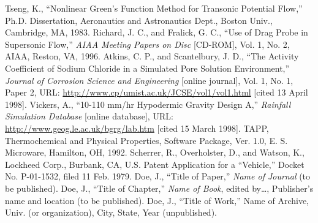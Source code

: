 \documentclass{AIAA}
\begin{document}
\begin{thebibliography}{}
 Tseng, K., ``Nonlinear Green's Function Method for Transonic Potential Flow,'' Ph.D. Dissertation, Aeronautics and Astronautics Dept., Boston Univ., Cambridge, MA, 1983.
 Richard, J. C., and Fralick, G. C., ``Use of Drag Probe in Supersonic Flow,'' \textit{AIAA Meeting Papers on Disc} [CD-ROM], Vol. 1, No. 2, AIAA, Reston, VA, 1996.
 Atkins, C. P., and Scantelbury, J. D., ``The Activity Coefficient of Sodium Chloride in a Simulated Pore Solution Environment,'' \textit{Journal of Corrosion Science and Engineering} [online journal], Vol. 1, No. 1, Paper 2, URL: \url{http://www.cp/umist.ac.uk/JCSE/vol1/vol1.html} [cited 13 April 1998].
 Vickers, A., ``10-110 mm/hr Hypodermic Gravity Design A,'' \textit{Rainfall Simulation Database} [online database], URL: \url{http://www.geog.le.ac.uk/bgrg/lab.htm} [cited 15 March 1998].
 TAPP, Thermochemical and Physical Properties, Software Package, Ver. 1.0, E. S. Microware, Hamilton, OH, 1992.
 Scherrer, R., Overholster, D., and Watson, K., Lockheed Corp., Burbank, CA, U.S. Patent Application for a ``Vehicle,'' Docket No. P-01-1532, filed 11 Feb. 1979.
 Doe, J., ``Title of Paper,'' \textit{Name of Journal} (to be published).
 Doe, J., ``Title of Chapter,'' \textit{Name of Book}, edited by\ldots , Publisher's name and location (to be published).
 Doe, J., ``Title of Work,'' Name of Archive, Univ. (or organization), City, State, Year (unpublished).
\end{thebibliography}
\end{document}

